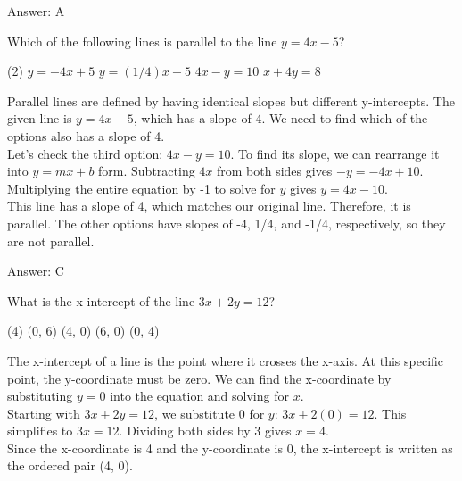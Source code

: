 \documentclass[11pt,paper=a4,answers]{exam}
\begin{document}
\begin{questions}
\begin{solution}
\vspace{15pt}
Answer: \colorbox{yellow!100}{A}
\end{solution}

\question
Which of the following lines is parallel to the line $y = 4x - 5$?
\begin{tasks}(2)
    \task $y = -4x + 5$
    \task $y = (1/4)x - 5$
    \task $4x - y = 10$
    \task $x + 4y = 8$
\end{tasks}

\begin{solution}
Parallel lines are defined by having identical slopes but different y-intercepts. The given line is $y = 4x - 5$, which has a slope of 4. We need to find which of the options also has a slope of 4.
\\[10pt]
Let's check the third option: $4x - y = 10$. To find its slope, we can rearrange it into $y = mx + b$ form. Subtracting $4x$ from both sides gives $-y = -4x + 10$. Multiplying the entire equation by -1 to solve for $y$ gives $y = 4x - 10$.
\\[10pt]
This line has a slope of 4, which matches our original line. Therefore, it is parallel. The other options have slopes of -4, 1/4, and -1/4, respectively, so they are not parallel.

\vspace{15pt}
Answer: \colorbox{yellow!100}{C}
\end{solution}

\question
What is the x-intercept of the line $3x + 2y = 12$?
\begin{tasks}(4)
    \task (0, 6)
    \task (4, 0)
    \task (6, 0)
    \task (0, 4)
\end{tasks}

\begin{solution}
The x-intercept of a line is the point where it crosses the x-axis. At this specific point, the y-coordinate must be zero. We can find the x-coordinate by substituting $y = 0$ into the equation and solving for $x$.
\\[10pt]
Starting with $3x + 2y = 12$, we substitute 0 for $y$: $3x + 2(0) = 12$. This simplifies to $3x = 12$. Dividing both sides by 3 gives $x = 4$.
\\[10pt]
Since the x-coordinate is 4 and the y-coordinate is 0, the x-intercept is written as the ordered pair (4, 0).


\end{solution}
\end{questions}
\end{document}
